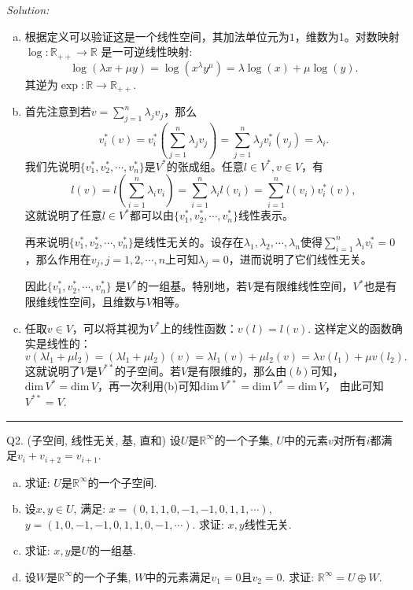 \documentclass[a4[paper]{article}
\newcommand\R{\mathbb{R}}  %
\begin{document}
\noindent{} \emph{Solution:}
\begin{enumerate}[(a).]
\item 根据定义可以验证这是一个线性空间，其加法单位元为$1$，维数为1。对数映射$\log:\mathbb{R}_{++}\rightarrow \mathbb{R}$ 是一可逆线性映射:
\[\log(\lambda x+\mu y) =\log(x^{\lambda}y^{\mu})=\lambda \log(x)+\mu\log(y).\]
其逆为$\exp: \mathbb{R}\rightarrow\mathbb{R}_{++}$.

\item 首先注意到若$v=\sum_{j=1}^n\lambda_j v_j$，那么
\[v_i^*(v) = v_i^*(\sum_{j=1}^n\lambda_j v_j)=\sum_{j=1}^n\lambda_j v_i^*(v_j)=\lambda_i.\]
我们先说明$\{v_1^*,v_2^*,\cdots,v_n^*\}$是$V^*$的张成组。任意$l \in V^*, v\in V$，有
\[l(v) = l(\sum_{i=1}^n \lambda_i v_i) = \sum_{i=1}^n\lambda_i l (v_i) =  \sum_{i=1}^n l (v_i) v_i^*(v),\]
这就说明了任意$l \in V^*$都可以由$\{v_1^*,v_2^*,\cdots,v_n^*\}$线性表示。

再来说明$\{v_1^*,v_2^*,\cdots,v_n^*\}$是线性无关的。设存在$\lambda_1,\lambda_2,\cdots,\lambda_n$使得$\sum_{i=1}^n\lambda_i v_i^*=0$，那么作用在$v_j,j=1,2,\cdots,n$上可知$\lambda_j=0$，进而说明了它们线性无关。

因此$\{v_1^*,v_2^*,\cdots,v_n^*\}$ 是$V^*$的一组基。特别地，若$V$是有限维线性空间，$V^*$也是有限维线性空间，且维数与$V$相等。

\item 任取$v\in V$，可以将其视为$V^*$上的线性函数：$v(l) = l(v)$. 这样定义的函数确实是线性的：
\[v(\lambda l_1+\mu l_2) = (\lambda l_1+\mu l_2)(v) = \lambda l_1(v)+\mu l_2(v)=\lambda v(l_1)+\mu v(l_2).\] 
这就说明了$V$是$V^{**}$的子空间。若$V$是有限维的，那么由$(b)$可知，$\mathrm{dim}\, V^* = \mathrm{dim}\, V$，再一次利用(b)可知$\mathrm{dim}\, V^{**}=\mathrm{dim}\, V^* = \mathrm{dim}\,V$， 由此可知$V^{**}=V$.
\end{enumerate} 

\bigskip
\noindent{}\rule{\textwidth}{0.1mm}
\bigskip

\noindent{} Q2. (子空间, 线性无关, 基, 直和) 设$U$是$\R^\infty$的一个子集, $U$中的元素$v$对所有$i$都满足$v_i + v_{i + 2} = v_{i + 1}$.
\begin{enumerate}[(a).]
	\item 求证: $U$是$\R^\infty$的一个子空间.
	\item 设$x, y \in U$, 满足: $x = (0, 1, 1, 0, -1, -1, 0, 1, 1, \cdots)$, $y = (1, 0, -1, -1, 0, 1, 1, 0, -1, \cdots)$. 求证: $x, y$线性无关.
	\item 求证: $x, y$是$U$的一组基.
	\item 设$W$是$\R^\infty$的一个子集, $W$中的元素满足$v_1 = 0$且$v_2 = 0$. 求证: $\R^\infty = U \oplus W$.
\end{enumerate}
\end{document}
